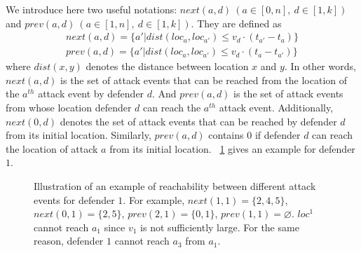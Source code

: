We introduce here two useful notations: $next(a, d)\ (a\in[0, n],\ d\in[1,k])$ and $prev(a, d)\ (a\in[1,n],\ d \in [1,k])$.
They are defined as
\begin{align}
next(a, d) = \{ a'| dist(loc_a, loc_{a'}) \leq v_d \cdot (t_{a'} - t_a) \}    \\
prev(a, d) = \{ a'| dist(loc_a, loc_{a'}) \leq v_d \cdot (t_a - t_{a'}) \}    
\end{align}
where $dist(x,y)$ denotes the distance between location $x$ and $y$. 
In other words, $next(a, d)$ is the set of 
attack events that can be reached from the location of the $a^{th}$ attack event by defender $d$. 
And $prev(a,d)$ is the set of attack events from whose location defender $d$ can reach the $a^{th}$ attack event. 
Additionally, $next(0, d)$ denotes the set of attack events that can be reached by defender $d$ from its initial location.
Similarly, $prev(a, d)$ contains $0$ if defender $d$ can reach the location of attack $a$ from its initial location.
~\ref{fig:next_prev} gives an example for defender $1$.

\begin{figure}[h]
    \centering
{}
    \caption{Illustration of an example of reachability between different attack events for defender $1$.  
    For example, $next(1, 1) = \{2,4,5\}$, $next(0,1)=\{2,5\}$, $prev(2, 1) =\{0, 1\}$, $prev(1,1)=\varnothing$.
    $loc^1$ cannot reach $a_1$ since $v_1$ is not sufficiently large. For the same reason, defender $1$ cannot reach $a_3$ from $a_1$.
    }
    \label{fig:next_prev}
\end{figure}

